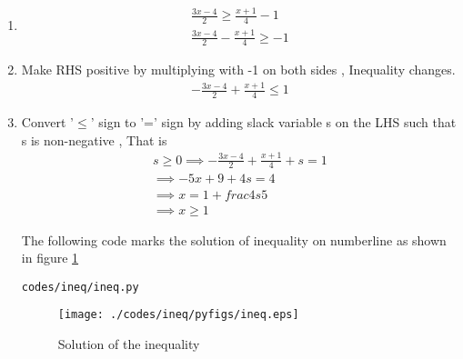 \renewcommand{\theequation}{\theenumi}
\begin{enumerate}[label=\thesection.\arabic*.,ref=\thesection.\theenumi]

\item 
\begin{align}
\frac{3x-4}{2} \geq \frac{x+1}{4} - 1
\\
\frac{3x-4}{2}-\frac{x+1}{4} \geq -1
\end{align}
\item Make RHS positive by multiplying with -1 on both sides , Inequality changes.
\begin{align}
-\frac{3x-4}{2}+\frac{x+1}{4} \leq 1
\end{align}
\item Convert '$\leq$' sign to '=' sign by adding slack variable s on the LHS such that s is non-negative , That is
\begin{align}
s \geq 0
\implies -\frac{3x-4}{2}+\frac{x+1}{4} + s = 1
\\
\implies -5x+9+4s=4
\\
\implies x=1+frac{4s}{5}
\\
\implies x \geq 1
\end{align}

The following code marks the solution of inequality on numberline as shown in figure \ref{fig:ineq_py}
\begin{lstlisting}
codes/ineq/ineq.py
\end{lstlisting}
\begin{figure}[!ht]
\centering
\texttt{[image: ./codes/ineq/pyfigs/ineq.eps]}
\caption{Solution of the inequality}
\label{fig:ineq_py}
\end{figure}

\end{enumerate}
